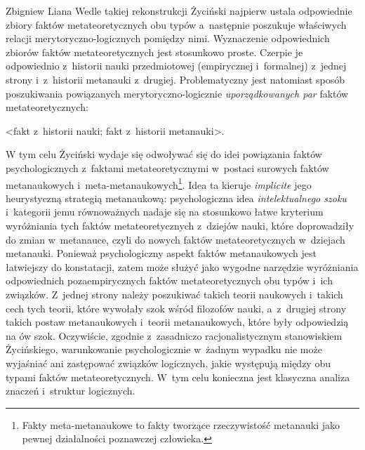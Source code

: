 \begin{artplenv}{Zbigniew Liana}
Wedle takiej rekonstrukcji Życiński najpierw ustala odpowiednie zbiory faktów metateoretycznych obu typów a~następnie
poszukuje właściwych relacji merytoryczno-logicznych pomiędzy nimi. Wyznaczenie odpowiednich zbiorów faktów
metateoretycznych jest stosunkowo proste. Czerpie je odpowiednio z~historii nauki przedmiotowej
(empirycznej i~formalnej) z~jednej strony i~z~historii metanauki z~drugiej. Problematyczny jest natomiast sposób poszukiwania
powiązanych merytoryczno-logicznie \textit{uporządkowanych par} faktów metateoretycznych: 

\smallskip
{\centering
	{\textless}fakt z~historii nauki; fakt z~historii metanauki{\textgreater}.
\par}
\smallskip


W tym celu Życiński wydaje się odwoływać się do idei powiązania faktów psychologicznych z~faktami metateoretycznymi w~postaci
surowych faktów metanaukowych i~meta-metanaukowych\footnote{Fakty meta-metanaukowe to fakty tworzące
rzeczywistość metanauki jako pewnej działalności poznawczej człowieka.}. Idea ta kieruje \textit{implicite} jego
heurystyczną strategią metanaukową: psychologiczna idea \textit{intelektualnego szoku} i~kategorii jemu równoważnych
nadaje się na stosunkowo łatwe kryterium wyróżniania tych faktów metateoretycznych z~dziejów nauki, które doprowadziły
do zmian w~metanauce, czyli do nowych faktów metateoretycznych w~dziejach metanauki. Ponieważ psychologiczny aspekt
faktów metanaukowych jest łatwiejszy do konstatacji, zatem może służyć jako wygodne narzędzie wyróżniania odpowiednich
pozaempirycznych faktów metateoretycznych obu typów i~ich związków. Z~jednej strony należy poszukiwać takich teorii
naukowych i~takich cech tych teorii, które wywołały szok wśród filozofów nauki, a~z~drugiej strony takich postaw
metanaukowych i~teorii metanaukowych, które były odpowiedzią na ów szok. Oczywiście, zgodnie z~zasadniczo
racjonalistycznym stanowiskiem Życińskiego, warunkowanie psychologicznie w~żadnym wypadku nie może wyjaśniać ani
zastępować związków logicznych, jakie występują między obu typami faktów metateoretycznych. W~tym celu konieczna jest
klasyczna analiza znaczeń i~struktur logicznych.


\end{artplenv}
